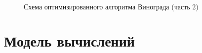 \begin{figure}[h!]
	\caption{Схема оптимизированного алгоритма Винограда (часть 2)}
	\label{pic_vinograd_opt_scheme_2}
\end{figure}
\clearpage

\section{Модель вычислений}

